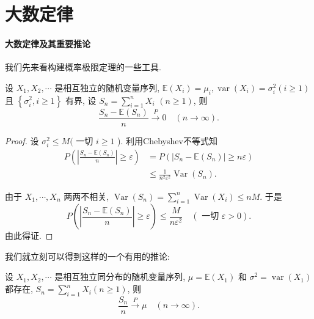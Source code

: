 \section{大数定律}
\paragraph{大数定律及其重要推论}

我们先来看构建概率极限定理的一些工具.

\begin{theorem}[Chebyshev大数律] 
    设 $X_1, X_2, \cdots$ 是相互独立的随机变量序列, $\mathbb{E}\left(X_i\right)=\mu_i, \operatorname{var}\left(X_i\right)=\sigma_i^2(i \geqslant 1)$ 且 $\left\{\sigma_i^2, i \geqslant 1\right\}$ 有界, 设 $S_n=\sum_{i=1}^n X_i$ $(n \geqslant 1)$, 则
$$
\frac{S_n-\mathbb{E}\left(S_n\right)}{n} \stackrel{P}{\longrightarrow} 0 \quad(n \rightarrow \infty) .
$$
\end{theorem}

\begin{proof}
    设 $\sigma_i^2 \leq M($ 一切 $i \geqslant 1$ ). 利用Chebyshev不等式知
$$
\begin{aligned}
P\left(\left|\frac{S_n-\mathbb{E}\left(S_n\right)}{n}\right| \geqslant \varepsilon\right) & =P\left(\left|S_n-\mathbb{E}\left(S_n\right)\right| \geqslant n \varepsilon\right) \\
& \leq \frac{1}{n^2 \varepsilon^2} \operatorname{Var}\left(S_n\right) .
\end{aligned}
$$

由于 $X_1, \cdots, X_n$ 两两不相关, $\operatorname{Var}\left(S_n\right)=\sum_{i=1}^n \operatorname{Var}\left(X_i\right) \leq n M$. 于是
$$
P\left(\left|\frac{S_n-\mathbb{E}\left(S_n\right)}{n}\right| \geqslant \varepsilon\right) \leq \frac{M}{n \varepsilon^2} \quad(\text { 一切 } \varepsilon>0) .
$$
由此得证. 

\end{proof}

我们就立刻可以得到这样的一个有用的推论: 

\begin{corollary}
    设 $X_1, X_2, \cdots$ 是相互独立同分布的随机变量序列, $\mu=\mathbb{E}\left(X_1\right)$ 和 $\sigma^2=\operatorname{var}\left(X_1\right)$ 都存在, $S_n=\sum_{i=1}^n X_i(n \geqslant 1)$, 则
    $$
    \frac{S_n}{n} \stackrel{P}{\longrightarrow} \mu \quad(n \rightarrow \infty) .
    $$
\end{corollary}




